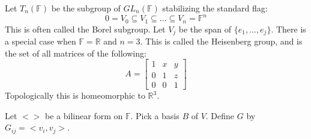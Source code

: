     \begin{example}
        Let $T_{n}(\mathbb{F})$ be the subgroup of $GL_{n}(\mathbb{F})$
        stabilizing the standard flag:
        \begin{equation}
            0=V_{0}\subseteq{V}_{1}
            \subseteq\dots\subseteq{V}_{n}=\mathbb{F}^{n}
        \end{equation}
        This is often called the Borel subgroup. Let $V_{j}$ be
        the span of $\{e_{1},\dots,e_{j}\}$. There is a special case when
        $\mathbb{F}=\mathbb{R}$ and $n=3$. This is called the
        Heisenberg group, and is the set of all matrices of the following:
        \begin{equation}
            A=\begin{bmatrix}
                1&x&y\\
                0&1&z\\
                0&0&1
            \end{bmatrix}
        \end{equation}
        Topologically this is homeomorphic to $\mathbb{R}^{3}$.
    \end{example}
    Let $<>$ be a bilinear form on $\mathbb{F}$. Pick a basis $B$ of $V$.
    Define $G$ by $G_{ij}=<v_{i},v_{j}>$.

